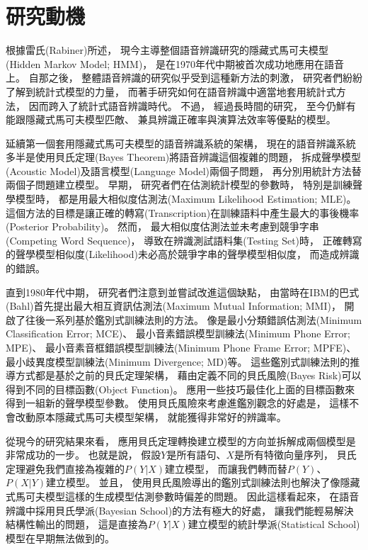 \section{研究動機}
根據雷氏(Rabiner)\cite{Rabiner}所述，
現今主導整個語音辨識研究的隱藏式馬可夫模型(Hidden Markov Model; HMM)，
是在1970年代中期被首次成功地應用在語音上。
自那之後，
整體語音辨識的研究似乎受到這種新方法的刺激，
研究者們紛紛了解到統計式模型的力量，
而著手研究如何在語音辨識中適當地套用統計式方法，
因而跨入了統計式語音辨識時代。
不過，
經過長時間的研究，
至今仍鮮有能跟隱藏式馬可夫模型匹敵、
兼具辨識正確率與演算法效率等優點的模型。

延續第一個套用隱藏式馬可夫模型的語音辨識系統的架構\cite{Baker75}，
現在的語音辨識系統多半是使用貝氏定理(Bayes Theorem)將語音辨識這個複雜的問題，
拆成聲學模型(Acoustic Model)及語言模型(Language Model)兩個子問題，
再分別用統計方法替兩個子問題建立模型。
早期，
研究者們在估測統計模型的參數時，
特別是訓練聲學模型時，
都是用最大相似度估測法(Maximum Likelihood Estimation; MLE)。
這個方法的目標是讓正確的轉寫(Transcription)在訓練語料中產生最大的事後機率(Posterior Probability)。
然而，
最大相似度估測法並未考慮到競爭字串(Competing Word Sequence)，
導致在辨識測試語料集(Testing Set)時，
正確轉寫的聲學模型相似度(Likelihood)未必高於競爭字串的聲學模型相似度，
而造成辨識的錯誤。

直到1980年代中期，
研究者們注意到並嘗試改進這個缺點，
由當時在IBM的巴式(Bahl)\cite{Bahl}首先提出最大相互資訊估測法(Maximum Mutual Information; MMI)，
開啟了往後一系列基於鑑別式訓練法則的方法。
像是最小分類錯誤估測法(Minimum Classification Error; MCE)\cite{Juang}、
最小音素錯誤模型訓練法(Minimum Phone Error; MPE)\cite{Povey}、
最小音素音框錯誤模型訓練法(Minimum Phone Frame Error; MPFE)\cite{Zheng}、
最小歧異度模型訓練法(Minimum Divergence; MD)\cite{JDu}等。
這些鑑別式訓練法則的推導方式都是基於之前的貝氏定理架構，
藉由定義不同的貝氏風險(Bayes Risk)可以得到不同的目標函數(Object Function)。
應用一些技巧最佳化上面的目標函數來得到一組新的聲學模型參數。
使用貝氏風險來考慮進鑑別觀念的好處是，
這樣不會改動原本隱藏式馬可夫模型架構，
就能獲得非常好的辨識率。

從現今的研究結果來看，
應用貝氏定理轉換建立模型的方向並拆解成兩個模型是非常成功的一步。
也就是說，
假設$Y$是所有語句、$X$是所有特徵向量序列，
貝氏定理避免我們直接為複雜的$P(Y|X)$建立模型，
而讓我們轉而替$P(Y)$、$P(X|Y)$建立模型。
並且，
使用貝氏風險導出的鑑別式訓練法則也解決了像隱藏式馬可夫模型這樣的生成模型估測參數時偏差的問題。
因此這樣看起來，
在語音辨識中採用貝氏學派(Bayesian School)的方法有極大的好處，
讓我們能輕易解決結構性輸出的問題，
這是直接為$P(Y|X)$建立模型的統計學派(Statistical School)模型在早期無法做到的。

